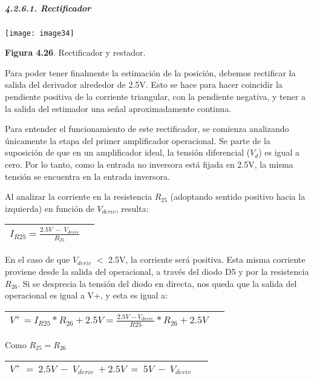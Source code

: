 \documentclass{article} %
\begin{document}
\noindent 
\subparagraph{4.2.6.1. Rectificador}

\noindent \texttt{[image: image34]}

\noindent \textbf{Figura 4.26}. Rectificador y restador.

\noindent 

\noindent Para poder tener finalmente la estimaci\'{o}n de la posici\'{o}n, debemos rectificar la salida del derivador alrededor de 2.5V. Esto se hace para hacer coincidir la pendiente positiva de la corriente triangular, con la pendiente negativa, y tener a la salida del estimador una se\~{n}al aproximadamente continua. 

\noindent 

\noindent Para entender el funcionamiento de este rectificador, se comienza analizando \'{u}nicamente la etapa del primer amplificador operacional. Se parte de la suposici\'{o}n de que en un amplificador ideal, la tensi\'{o}n diferencial ($V_d$) es igual a cero. Por lo tanto, como la entrada no inversora est\'{a} fijada en 2.5V, la misma tensi\'{o}n se encuentra en la entrada inversora. 

\noindent 

\noindent Al analizar la corriente en la resistencia $R_{25}$ (adoptando sentido positivo hacia la izquierda) en funci\'{o}n de $V_{deriv}$, resulta:

\noindent 

\begin{tabular}{|p{3.9in}|p{0.4in}|} \hline 
$I_{R25}=\frac{2.5V\ -\ V_{deriv}}{R_{25}}$ &   \\ \hline 
\end{tabular}



\noindent En el caso de que $V_{deriv}$ $\mathrm{<}$ 2.5V, la corriente ser\'{a} positiva. Esta misma corriente proviene desde la salida del operacional, a trav\'{e}s del diodo D5 y por la resistencia $R_{26}$. Si se desprecia la tensi\'{o}n del diodo en directa, nos queda que la salida del operacional es igual a V+, y esta es igual a:

\begin{tabular}{|p{3.9in}|p{0.4in}|} \hline 
$V^+=I_{R25}*R_{26}+2.5V=\frac{2.5V-V_{deriv}\ }{R25}*R_{26}+2.5V\ $ &   \\ \hline 
\end{tabular}

Como $R_{25}=R_{26}$

\begin{tabular}{|p{3.9in}|p{0.4in}|} \hline 
$V^+\ =\ 2.5V\ -\ V_{deriv}\ +2.5V\ =\ 5V\ -\ V_{deriv}\ $ &   \\ \hline 
\end{tabular}
\end{document}
